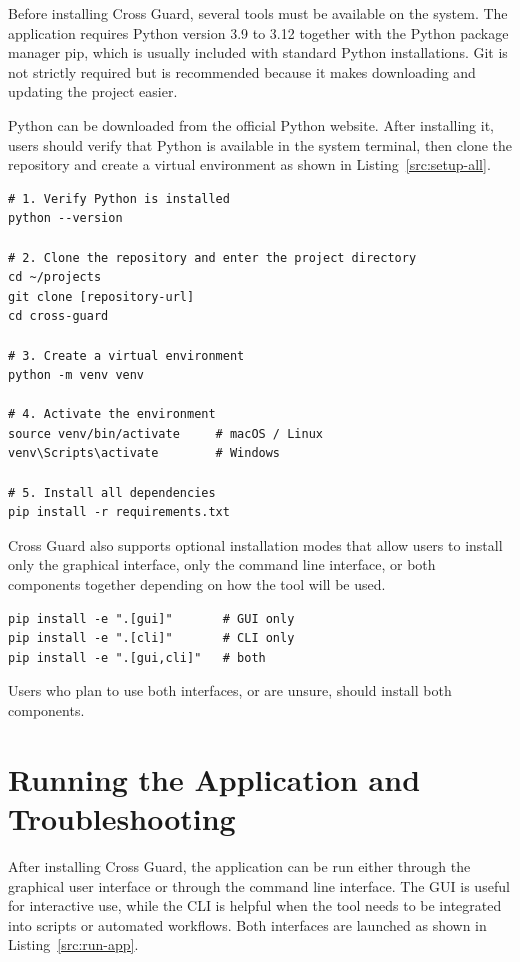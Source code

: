 Before installing Cross Guard, several tools must be available on the system. The application requires Python version 3.9 to 3.12 together with the Python package manager pip, which is usually included with standard Python installations. Git is not strictly required but is recommended because it makes downloading and updating the project easier.

Python can be downloaded from the official Python website. After installing it, users should verify that Python is available in the system terminal, then clone the repository and create a virtual environment as shown in Listing~\ref{src:setup-all}.

\begin{lstlisting}[caption={Complete setup: verify Python, clone the repository, create and activate a virtual environment, and install dependencies}, label=src:setup-all, basicstyle=\ttfamily\small, breaklines=true]
# 1. Verify Python is installed
python --version

# 2. Clone the repository and enter the project directory
cd ~/projects
git clone [repository-url]
cd cross-guard

# 3. Create a virtual environment
python -m venv venv

# 4. Activate the environment
source venv/bin/activate     # macOS / Linux
venv\Scripts\activate        # Windows

# 5. Install all dependencies
pip install -r requirements.txt
\end{lstlisting}
\newpage

Cross Guard also supports optional installation modes that allow users to install only the graphical interface, only the command line interface, or both components together depending on how the tool will be used.

\begin{lstlisting}[caption={Optional installation modes}, basicstyle=\ttfamily\small]
pip install -e ".[gui]"       # GUI only
pip install -e ".[cli]"       # CLI only
pip install -e ".[gui,cli]"   # both
\end{lstlisting}

Users who plan to use both interfaces, or are unsure, should install both components.

\section{Running the Application and Troubleshooting}
\label{sec:running}

After installing Cross Guard, the application can be run either through the graphical user interface or through the command line interface. The GUI is useful for interactive use, while the CLI is helpful when the tool needs to be integrated into scripts or automated workflows. Both interfaces are launched as shown in Listing~\ref{src:run-app}.

